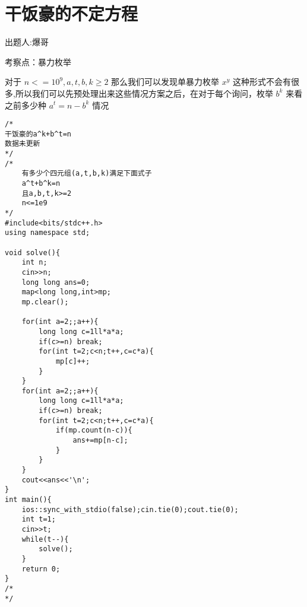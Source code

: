 \documentclass[12pt, a4paper, oneside]{ctexart}
\begin{document}
\section{干饭豪的不定方程} 
出题人:爆哥  \par
考察点：暴力枚举 \par 
\hspace*{\fill} \par
对于 $n<=10^9,a,t,b,k\geq2$ 那么我们可以发现单暴力枚举 $x^y$ 这种形式不会有很多,所以我们可以先预处理出来这些情况方案之后，在对于每个询问，枚举 $b^k$ 来看之前多少种 $a^t=n-b^k$ 情况 \par 
\begin{lstlisting}
/*
干饭豪的a^k+b^t=n
数据未更新
*/
/*
    有多少个四元组(a,t,b,k)满足下面式子
    a^t+b^k=n
    且a,b,t,k>=2
    n<=1e9
*/
#include<bits/stdc++.h>
using namespace std;

void solve(){
    int n;
    cin>>n;
    long long ans=0;
    map<long long,int>mp;
    mp.clear();

    for(int a=2;;a++){
        long long c=1ll*a*a;
        if(c>=n) break;
        for(int t=2;c<n;t++,c=c*a){
            mp[c]++;
        }
    }
    for(int a=2;;a++){
        long long c=1ll*a*a;
        if(c>=n) break;
        for(int t=2;c<n;t++,c=c*a){
            if(mp.count(n-c)){
                ans+=mp[n-c];
            }
        }
    }
    cout<<ans<<'\n';
}
int main(){
    ios::sync_with_stdio(false);cin.tie(0);cout.tie(0);
    int t=1;
    cin>>t;
    while(t--){
        solve();
    }
    return 0;
}
/*
*/
\end{lstlisting}


\newpage 
\end{document}
